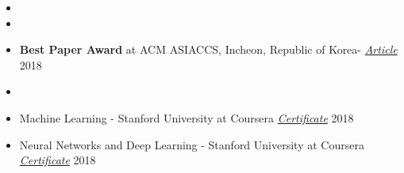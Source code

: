 
\begin{itemize}[noitemsep,topsep=0pt]
	\item {}
	\item {}
	\item \textbf{Best Paper Award} at ACM ASIACCS, Incheon, Republic of Korea- \href{https://www.bu.edu/eng/2018/08/14/best-paper-award-asia-conference-on-computer-and-communication-security-2018/}{ \textit{Article}} 2018
	\item {}
	\item Machine Learning - Stanford University at Coursera  \href{https://www.coursera.org/account/accomplishments/verify/U5YHWN3XSAQU}{\textit{Certificate}} 2018
	\item Neural Networks and Deep Learning - Stanford University at Coursera \href{https://www.coursera.org/account/accomplishments/verify/ZU26W977NR9P}{\textit{Certificate}} 2018\\
\end{itemize}